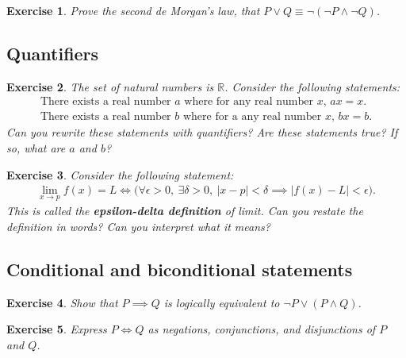 \documentclass{article}[12pt]
\newtheorem{exercise}{Exercise}[section]
\newcommand{\R}{\mathbb{R}}
\begin{document}
        \begin{exercise}
            Prove the second de Morgan's law, that $P \lor Q  \equiv \neg (\neg P \land \neg Q)$.
        \end{exercise}
    
    \subsection{Quantifiers}
        
        \begin{exercise}
            The set of natural numbers is $\R$. Consider the following statements:
            \begin{align}
                \text{There exists a real number $a$ where for any real number $x$, $ax = x$.}
                \\
                \text{There exists a real number $b$ where for a any real number $x$, $bx = b$.}
            \end{align}
            Can you rewrite these statements with quantifiers? Are these statements true? If so, what are $a$ and $b$?
        \end{exercise}
        
        \begin{exercise}
            Consider the following statement:
            \begin{align}
                \lim_{x \to p} f(x) = L
                \iff
                \bigg(
                \forall \epsilon > 0, \ 
                \exists \delta > 0, \
                | x - p | < \delta \implies | f(x) - L | < \epsilon
                \bigg)
                .
            \end{align}
            This is called the \textbf{epsilon-delta definition} of limit. Can you restate the definition in words? Can you interpret what it means?
        \end{exercise}
        
    
    \subsection{Conditional and biconditional statements}
    
        \begin{exercise}
            Show that $P \implies Q$ is logically equivalent to $\neg P \lor (P \land Q)$.
        \end{exercise}
        \begin{exercise}
            Express $P \iff Q$ as negations, conjunctions, and disjunctions of $P$ and $Q$.
        \end{exercise}
        
\end{document}
